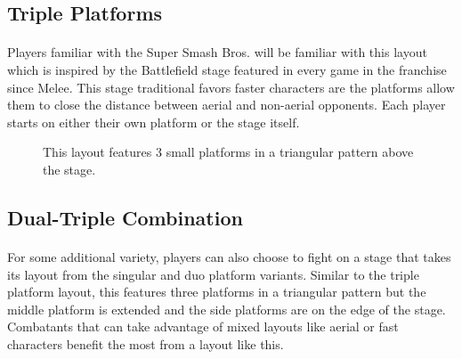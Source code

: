 \pagebreak

\subsection{Triple Platforms}

\paragraph{} Players familiar with the Super Smash Bros. will be familiar with this layout which is inspired by the Battlefield stage featured in every game in the franchise since Melee. This stage traditional favors faster characters are the platforms allow them to close the distance between aerial and non-aerial opponents. Each player starts on either their own platform or the stage itself.

\begin{figure}[h!]
    \centering
    \caption{This layout features 3 small platforms in a triangular pattern above the stage.}
\end{figure}

\pagebreak

\subsection{Dual-Triple Combination}

\paragraph{} For some additional variety, players can also choose to fight on a stage that takes its layout from the singular and duo platform variants. Similar to the triple platform layout, this features three platforms in a triangular pattern but the middle platform is extended and the side platforms are on the edge of the stage. Combatants that can take advantage of mixed layouts like aerial or fast characters benefit the most from a layout like this. 

